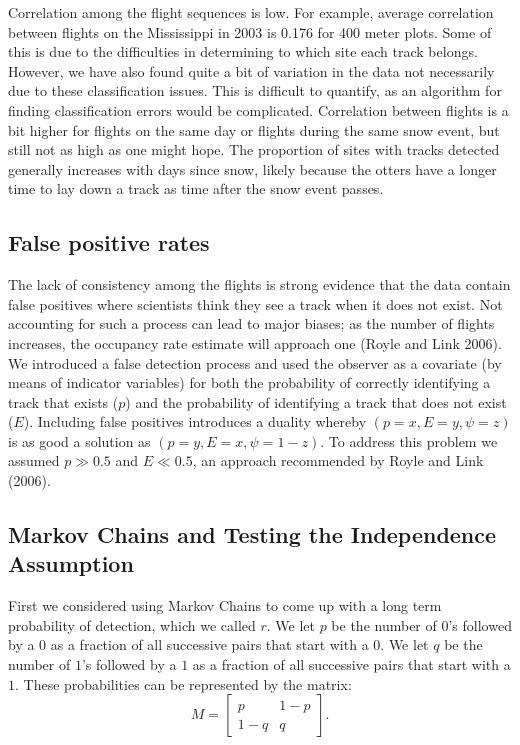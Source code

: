 \documentclass[12pt]{article}
\begin{document}
    Correlation among the flight sequences is low. For example, average
    correlation between flights on the Mississippi in 2003 is 0.176 for 400
    meter plots. Some of this is due to the difficulties in determining to which
    site each track belongs. However, we have also found quite a bit of
    variation in the data not necessarily due to these classification issues.
    This is difficult to quantify, as an algorithm for finding classification
    errors would be complicated. Correlation between flights is a bit higher for
    flights on the same day or flights during the same snow event, but still not
    as high as one might hope. The proportion of sites with tracks detected
    generally increases with days since snow, likely because the otters have a
    longer time to lay down a track as time after the snow event passes.

    \subsection{False positive rates}
    The lack of consistency among the flights is strong evidence that the data
    contain false positives where scientists think they see a track when it does
    not exist. Not accounting for such a process can lead to major biases; as
    the number of flights increases, the occupancy rate estimate will approach
    one (Royle and Link 2006). We introduced a false detection process and used
    the observer as a covariate (by means of indicator variables) for both the
    probability of correctly identifying a track that exists ($p$) and the
    probability of identifying a track that does not exist ($E$). Including
    false positives introduces a duality whereby $(p=x,E=y,\psi=z)$ is as good a
    solution as $(p=y,E=x,\psi=1-z)$. To address this problem we assumed
    $p\gg0.5$ and $E\ll0.5$, an approach recommended by Royle and Link (2006).

    \subsection{Markov Chains and Testing the Independence Assumption}
    \label{shat}
    First we considered using Markov Chains to come up with a long term
    probability of detection, which we called \(r\). We let \(p\) be the number
    of \(0\)'s followed by a \(0\) as a fraction of all successive pairs that
    start with a \(0\). We let \(q\) be the number of \(1\)'s followed by a
    \(1\) as a fraction of all successive pairs that start with a \(1\). These
    probabilities can be represented by the matrix:
    \[M=\begin{bmatrix}
        p & 1-p \\
        1-q & q
    \end{bmatrix}\text{.}\]
\end{document}
